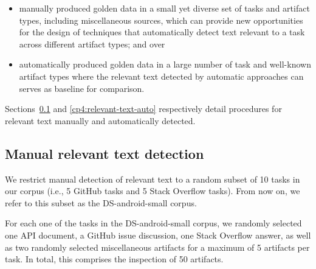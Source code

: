 \begin{itemize}
    \item manually produced golden data in a small yet diverse set of tasks and artifact types, including miscellaneous sources, which can provide new opportunities for the design of techniques that automatically detect text relevant to a task across different artifact types; and over
    \item automatically produced golden data in a large number of
    task and well-known artifact types where the relevant text detected by automatic approaches can serves as
    baseline for comparison.
\end{itemize}


Sections~\ref{cp4:relevant-text-manual} and \ref{cp4:relevant-text-auto} respectively detail procedures for 
relevant text manually and automatically detected.





\subsection{Manual relevant text detection}
\label{cp4:relevant-text-manual}



We restrict manual detection of relevant text 
to a random subset of 10 tasks in our corpus (i.e., 5 GitHub tasks and 5 Stack Overflow tasks). 
From now on, we refer to this subset as the \acs{DS-android-small} corpus.


For each one of the tasks in the \acs{DS-android-small} corpus, we randomly selected 
one API document, a GitHub issue discussion, one Stack Overflow answer, as well as two randomly selected miscellaneous artifacts for a maximum of 5 artifacts per task.
In total, this comprises the inspection of 50 artifacts.




